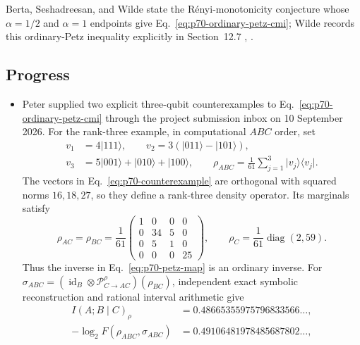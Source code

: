 Berta, Seshadreesan, and Wilde state the R\'enyi-monotonicity conjecture whose
$\alpha=1/2$ and $\alpha=1$ endpoints give
Eq.~\eqref{eq:p70-ordinary-petz-cmi}; Wilde records this ordinary-Petz
inequality explicitly in Section~12.7
,
.

\subsection*{Progress}

\begin{itemize}
  \item Peter supplied two explicit three-qubit counterexamples to
Eq.~\eqref{eq:p70-ordinary-petz-cmi} through the project submission inbox
on 10 September 2026. For the rank-three example, in computational
$ABC$ order, set
\begin{equation}
  \begin{aligned}
    v_1&=4\lvert111\rangle,\qquad
    v_2=3(\lvert011\rangle-\lvert101\rangle),\\
    v_3&=5\lvert001\rangle+\lvert010\rangle+\lvert100\rangle,\qquad
    \rho_{ABC}=\frac1{61}\sum_{j=1}^3\lvert v_j\rangle\!\langle v_j\rvert.
  \end{aligned}
  \label{eq:p70-counterexample}
\end{equation}
The vectors in Eq.~\eqref{eq:p70-counterexample} are orthogonal with
squared norms $16,18,27$, so they define a rank-three density operator.
Its marginals satisfy
\begin{equation}
  \rho_{AC}=\rho_{BC}=\frac1{61}
  \begin{pmatrix}1&0&0&0\\0&34&5&0\\0&5&1&0\\0&0&0&25\end{pmatrix},
  \qquad \rho_C=\frac1{61}\operatorname{diag}(2,59).
  \label{eq:p70-counterexample-marginals}
\end{equation}
Thus the inverse in Eq.~\eqref{eq:p70-petz-map} is an ordinary inverse.
For $\sigma_{ABC}=(\operatorname{id}_B\otimes\mathcal P^{\rho}_{C\to AC})(\rho_{BC})$,
independent exact symbolic reconstruction and rational interval arithmetic give
\begin{equation}
  \begin{aligned}
    I(A;B\mid C)_\rho&=0.48665355975796833566\ldots,\\
    -\log_2F(\rho_{ABC},\sigma_{ABC})&=0.49106481978485687802\ldots,\\

\end{aligned}
\end{equation}
\end{itemize}
